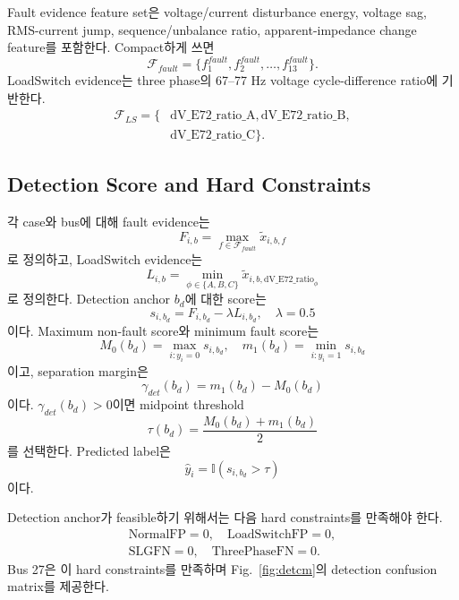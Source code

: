 \documentclass[conference]{IEEEtran}
\begin{document}
Fault evidence feature set은 voltage/current disturbance energy, voltage sag, RMS-current jump, sequence/unbalance ratio, apparent-impedance change feature를 포함한다. Compact하게 쓰면
\begin{equation}
\mathcal{F}_{fault}=\{f^{fault}_1,f^{fault}_2,\ldots,f^{fault}_{13}\}.
\end{equation}
LoadSwitch evidence는 three phase의 67--77 Hz voltage cycle-difference ratio에 기반한다.
\begin{align}
\mathcal{F}_{LS}=\{&\mathrm{dV\_E72\_ratio\_A},
\mathrm{dV\_E72\_ratio\_B},\nonumber\\
&\mathrm{dV\_E72\_ratio\_C}\}.
\end{align}

\subsection{Detection Score and Hard Constraints}

각 case와 bus에 대해 fault evidence는
\begin{equation}
F_{i,b}=\max_{f\in\mathcal{F}_{fault}}\tilde{x}_{i,b,f}
\end{equation}
로 정의하고, LoadSwitch evidence는
\begin{equation}
L_{i,b}=\min_{\phi\in\{A,B,C\}}\tilde{x}_{i,b,\mathrm{dV\_E72\_ratio}_{\phi}}
\end{equation}
로 정의한다. Detection anchor $b_d$에 대한 score는
\begin{equation}
s_{i,b_d}=F_{i,b_d}-\lambda L_{i,b_d},\quad \lambda=0.5
\end{equation}
이다. Maximum non-fault score와 minimum fault score는
\begin{equation}
M_0(b_d)=\max_{i:y_i=0}s_{i,b_d},\quad m_1(b_d)=\min_{i:y_i=1}s_{i,b_d}
\end{equation}
이고, separation margin은
\begin{equation}
\gamma_{det}(b_d)=m_1(b_d)-M_0(b_d)
\end{equation}
이다. $\gamma_{det}(b_d)>0$이면 midpoint threshold
\begin{equation}
\tau(b_d)=\frac{M_0(b_d)+m_1(b_d)}{2}
\end{equation}
를 선택한다. Predicted label은
\begin{equation}
\hat{y}_i=\mathbb{I}(s_{i,b_d}>\tau)
\end{equation}
이다.

Detection anchor가 feasible하기 위해서는 다음 hard constraints를 만족해야 한다.
\begin{align}
\mathrm{NormalFP}=0,\quad \mathrm{LoadSwitchFP}=0,\nonumber\\
\mathrm{SLGFN}=0,\quad \mathrm{ThreePhaseFN}=0.
\end{align}
Bus 27은 이 hard constraints를 만족하며 Fig.~\ref{fig:detcm}의 detection confusion matrix를 제공한다.
\end{document}
